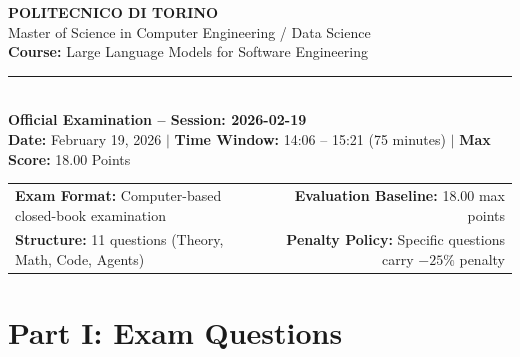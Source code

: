 \documentclass[11pt,a4paper]{article}
\begin{document}
\begin{tcolorbox}[
    enhanced,
    colback=primary!5,
    colframe=primary,
    arc=4pt,
    boxrule=1.2pt,
    left=14pt,
    right=14pt,
    top=10pt,
    bottom=10pt
]
\begin{center}
    {\Large\textbf{POLITECNICO DI TORINO}}\\[3pt]
    {\large Master of Science in Computer Engineering / Data Science}\\[2pt]
    {\textbf{Course:} Large Language Models for Software Engineering}\\[4pt]
    \rule{0.85\textwidth}{0.4pt}\\[5pt]
    {\Large\textbf{Official Examination -- Session: 2026-02-19}}\\[4pt]
    {\small\textbf{Date:} February 19, 2026 \quad $\vert$ \quad \textbf{Time Window:} 14:06 -- 15:21 (75 minutes) \quad $\vert$ \quad \textbf{Max Score:} 18.00 Points}
\end{center}
\vspace{-4pt}
\begin{tabularx}{\linewidth}{@{}X r@{}}
\textbf{Exam Format:} Computer-based closed-book examination & \textbf{Evaluation Baseline:} 18.00 max points \\
\textbf{Structure:} 11 questions (Theory, Math, Code, Agents) & \textbf{Penalty Policy:} Specific questions carry $-25\%$ penalty
\end{tabularx}
\end{tcolorbox}

\vspace{6pt}

\section*{Part I: Exam Questions}
\end{document}
